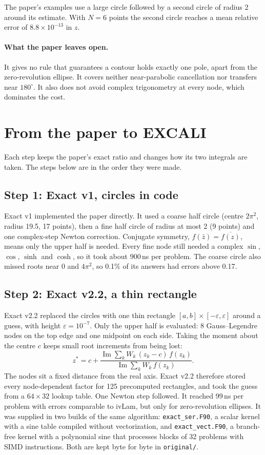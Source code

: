 \documentclass[11pt]{article}
\newcommand{\code}[1]{\texttt{#1}}
\begin{document}
The paper's examples use a large circle followed by a second circle of radius 2 around its estimate. With $N=6$ points the second circle reaches a mean relative error of $8.8\times10^{-13}$ in $z$.

\paragraph{What the paper leaves open.} It gives no rule that guarantees a contour holds exactly one pole, apart from the zero-revolution ellipse. It covers neither near-parabolic cancellation nor transfers near $180^\circ$. It also does not avoid complex trigonometry at every node, which dominates the cost.

\section{From the paper to EXCALI}

Each step keeps the paper's exact ratio and changes how its two integrals are taken. The steps below are in the order they were made.

\subsection*{Step 1: Exact v1, circles in code}
Exact v1 implemented the paper directly. It used a coarse half circle (centre $2\pi^2$, radius 19.5, 17 points), then a fine half circle of radius at most 2 (9 points) and one complex-step Newton correction. Conjugate symmetry, $f(\bar z) = \overline{f(z)}$, means only the upper half is needed. Every fine node still needed a complex $\sin$, $\cos$, $\sinh$ and $\cosh$, so it took about 900\,ns per problem. The coarse circle also missed roots near 0 and $4\pi^2$, so 0.1\% of its answers had errors above 0.17.

\subsection*{Step 2: Exact v2.2, a thin rectangle}
Exact v2.2 replaced the circles with one thin rectangle $[a,b]\times[-\varepsilon,\varepsilon]$ around a guess, with height $\varepsilon = 10^{-7}$. Only the upper half is evaluated: 8 Gauss--Legendre nodes on the top edge and one midpoint on each side. Taking the moment about the centre $c$ keeps small root increments from being lost:
\begin{equation}
  z^* = c + \frac{\operatorname{Im}\sum_k W_k\,(z_k-c)\,f(z_k)}{\operatorname{Im}\sum_k W_k\,f(z_k)}.
\end{equation}
The nodes sit a fixed distance from the real axis. Exact v2.2 therefore stored every node-dependent factor for 125 precomputed rectangles, and took the guess from a $64\times32$ lookup table. One Newton step followed. It reached 99\,ns per problem with errors comparable to ivLam, but only for zero-revolution ellipses. It was supplied in two builds of the same algorithm: \code{exact\_ser.F90}, a scalar kernel with a sine table compiled without vectorization, and \code{exact\_vect.F90}, a branch-free kernel with a polynomial sine that processes blocks of 32 problems with SIMD instructions. Both are kept byte for byte in \code{original/}.
\end{document}
